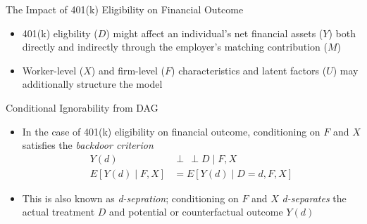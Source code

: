 \documentclass[aspectratio=1610,12pt,xcolor=dvipsnames]{beamer}
\newcommand{\indep}{\perp\!\!\!\, \perp}
\begin{document}
\begin{frame}{The Impact of 401(k) Eligibility on Financial Outcome}
\begin{itemize}
    \item 401(k) eligbility ($D$) might affect an individual's net financial assets ($Y$) both directly and indirectly through the employer's matching contribution ($M$)
    \item Worker-level ($X$) and firm-level ($F$) characteristics and latent factors ($U$) may additionally structure the model 
\end{itemize}

\centering
{}
\end{frame}


\begin{frame}{Conditional Ignorability from DAG}

\begin{itemize}
    \item In the case of 401(k) eligibility on financial outcome, conditioning on $F$ and $X$ satisfies the \textit{backdoor criterion}
    \begin{align*}
        Y(d) &\indep D \mid F, X \\
        E[Y(d) \mid F, X] &= E[Y(d) \mid D=d, F, X]
    \end{align*}
    \item This is also known as \textit{d-sepration}; conditioning on $F$ and $X$ \textit{d-separates} the actual treatment $D$ and potential or counterfactual outcome $Y(d)$
\end{itemize}
\end{frame}
\end{document}
